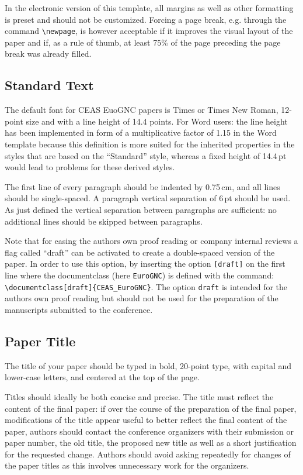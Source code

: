 \documentclass{CEAS_EuroGNC_2024}
\begin{document}
In the electronic version of this template, all margins as well as other formatting is preset and should not be customized. Forcing a page break, e.g. through the command \verb|\newpage|, is however acceptable if it improves the visual layout of the paper and if, as a rule of thumb, at least 75\% of the page preceding the page break was already filled.

\subsection{Standard Text}
The default font for CEAS EuoGNC papers is Times or Times New Roman, 12-point size and with a line height of 14.4 points. For Word users: the line height has been implemented in form of a multiplicative factor of 1.15 in the Word template because this definition is more suited for the inherited properties in the styles that are based on the ``Standard'' style, whereas a fixed height of 14.4\,pt would lead to problems for these derived styles. 

The first line of every paragraph should be indented by 0.75\,cm, and all lines should be single-spaced. A paragraph vertical separation of 6\,pt should be used. As just defined the vertical separation between paragraphs are sufficient: no additional lines should be skipped between paragraphs.

Note that for easing the authors own proof reading or company internal reviews a flag called ``draft'' can be activated to create a double-spaced version of the paper. In order to use this option, by inserting the option \verb|[draft]| on the first line where the documentclass (here \verb|EuroGNC|) is defined with the command: \verb|\documentclass[draft]{CEAS_EuroGNC}|. The option \verb|draft| is intended for the authors own proof reading but should not be used for the preparation of the manuscripts submitted to the conference.





\subsection{Paper Title}

The title of your paper should be typed in bold, 20-point type, with capital and lower-case letters, and centered at the top of the page. 

Titles should ideally be both concise and precise. The title must reflect the content of the final paper: if over the course of the preparation of the final paper, modifications of the title appear useful to better reflect the final content of the paper, authors should contact the conference organizers with their submission or paper number, the old title, the proposed new title as well as a short justification for the requested change. Authors should avoid asking repeatedly for changes of the paper titles as this involves unnecessary work for the organizers.
\end{document}
